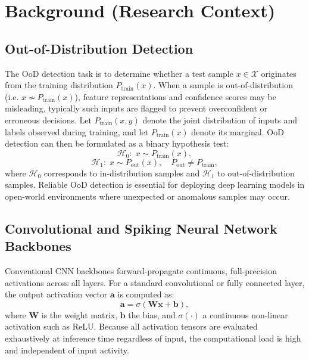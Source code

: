 \documentclass{ieeeaccess}
\begin{document}
\section{Background (Research Context)}
\label{sec:background}

\subsection{Out-of-Distribution Detection}

The OoD detection task is to determine whether a test sample $x \in \mathcal{X}$ originates from the training distribution $P_{\text{train}}(x)$. When a sample is out-of-distribution (i.e. $x \nsim P_{\text{train}}(x)$), feature representations and confidence scores may be misleading, typically such inputs are flagged to prevent overconfident or erroneous decisions. Let $P_{\text{train}}(x, y)$ denote the joint distribution of inputs and labels observed during training, and let $P_{\text{train}}(x)$ denote its marginal. OoD detection can then be formulated as a binary hypothesis test:
\begin{equation}
\label{eq:01a}
\mathcal{H}_0: \; x \sim P_{\text{train}}(x),
\end{equation}
\begin{equation}
\label{eq:01b}
\mathcal{H}_1: \; x \sim P_{\text{out}}(x), \quad P_{\text{out}} \neq P_{\text{train}},
\end{equation}
where $\mathcal{H}_0$ corresponds to in-distribution samples and $\mathcal{H}_1$ to out-of-distribution samples. Reliable OoD detection is essential for deploying deep learning models in open-world environments where unexpected or anomalous samples may occur.

\subsection{Convolutional and Spiking Neural Network Backbones}

Conventional CNN backbones forward-propagate continuous, full-precision activations across all layers. For a standard convolutional or fully connected layer, the output activation vector $\mathbf{a}$ is computed as:
\begin{equation}
\label{eq:cnn}
\mathbf{a} = \sigma(\mathbf{W}\mathbf{x} + \mathbf{b}),
\end{equation}
where $\mathbf{W}$ is the weight matrix, $\mathbf{b}$ the bias, and $\sigma(\cdot)$ a continuous non-linear activation such as ReLU. Because all activation tensors are evaluated exhaustively at inference time regardless of input, the computational load is high and independent of input activity.
\end{document}
